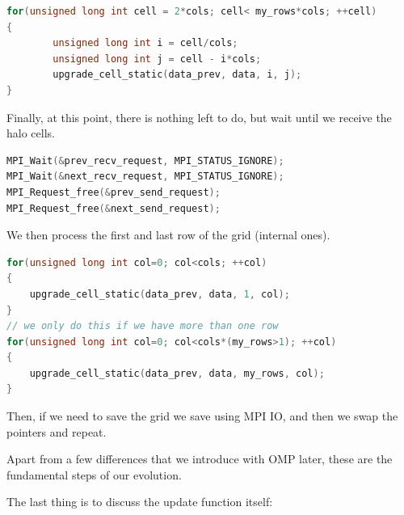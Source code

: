 \documentclass{report}
\begin{document}
\begin{lstlisting}[language=C++]
for(unsigned long int cell = 2*cols; cell< my_rows*cols; ++cell)
{
        unsigned long int i = cell/cols;
        unsigned long int j = cell - i*cols;
        upgrade_cell_static(data_prev, data, i, j);
}
\end{lstlisting}

Finally, at this point, there is nothing left to do, but wait until we receive 
the halo cells.

\begin{lstlisting}[language=C++]
MPI_Wait(&prev_recv_request, MPI_STATUS_IGNORE);
MPI_Wait(&next_recv_request, MPI_STATUS_IGNORE);
MPI_Request_free(&prev_send_request);
MPI_Request_free(&next_send_request);
\end{lstlisting}

We then process the first and last row of the grid (internal ones).

\begin{lstlisting}[language=C++]
for(unsigned long int col=0; col<cols; ++col)
{
    upgrade_cell_static(data_prev, data, 1, col);
}
// we only do this if we have more than one row 
for(unsigned long int col=0; col<cols*(my_rows>1); ++col)
{
    upgrade_cell_static(data_prev, data, my_rows, col);
}
\end{lstlisting}

Then, if we need to save the grid we save using MPI IO, and then we swap the 
pointers and repeat.

Apart from a few differences that we introduce with OMP later, these are the 
fundamental steps of our evolution.

The last thing is to discuss the update function itself:
\end{document}
